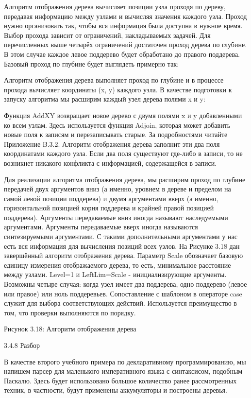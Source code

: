 Алгоритм отображения дерева вычисляет позиции узла проходя по дереву, передавая информацию между узлами и вычисляя значения каждого узла. Проход нужно организовать так, чтобы вся информация была доступна в нужное время. Выбор прохода зависит от ограничений, накладываемых задачей. Для перечисленных выше четырёх ограничений достаточен проход дерева по глубине. В этом случае каждое левое поддерево будет обработано до правого поддерева. Базовый проход по глубине будет выглядеть примерно так:

Алгоритм отображения дерева выполняет проход по глубине и в процессе прохода вычисляет координаты (x, y) каждого узла. В качестве подготовки к запуску алгоритма мы расширим каждый узел дерева полями x и y:

Функция AddXY возвращает новое дерево с двумя полями x и y добавленными ко всем узлам. Здесь используется функция Adjoin, которая может добавить новые поля к записям и перезаписывать старые. За подробностями читайте Приложение B.3.2. Алгоритм отображения дерева заполнит эти два поля координатами каждого узла. Если два поля существуют где-либо в записи, то не возникнет никакого конфликта с информацией, содержащейся в записи.

Для реализации алгоритма отображения дерева, мы расширим проход по глубине передачей двух аргументов вниз (а именно, уровнем в дереве и пределом на самой левой позиции поддерева) и двумя аргументами вверх (а именно, горизонтальной позицией корня поддерева и крайней правой позицией поддерева). Аргументы передаваемые вниз иногда называют наследуемыми аргументами. Аргументы передаваемые вверх иногда называются синтезируемыми аргументами. С такими дополнительными аргументами у нас есть вся информация для вычисления позиций всех узлов. На Рисунке 3.18 дан завершённый алгоритм отображения дерева. Параметр Scale обозначает базовую единицу измерения отображаемого дерева, то есть, минимальное расстояние между узлами. Level=1 и LeftLim=Scale - инициализирующие аргументы. Возможны четыре случая: когда узел имеет два поддерева, одно поддерево (левое или правое) или ноль поддеревьев. Сопоставление с шаблоном в операторе case служит для выбора соответствующих действий. Используется преимущество в том, что проверки выполняются по порядку.

Рисунок 3.18: Алгоритм отображения дерева

3.4.8 Разбор

В качестве второго учебного примера по декларативному программированию, мы напишем парсер для маленького императивного языка с синтаксисом, подобным Паскалю. Здесь будет использовано большое количество ранее рассмотренных техник, в частности, будут применены аккумуляторы и построены деревья.

